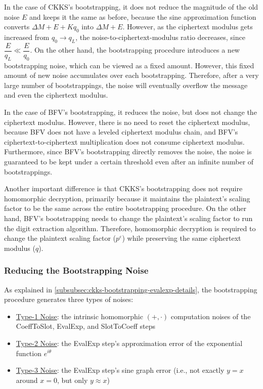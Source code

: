  In the case of CKKS's bootstrapping, it does not reduce the magnitude of the old noise $E$ and keeps it the same as before, because the sine approximation function converts $\Delta M + E + Kq_0$ into $\Delta M + E$. However, as the ciphertext modulus gets increased from $q_0 \rightarrow q_L$, the noise-to-ciphertext-modulus ratio decreases, since $\dfrac{E}{q_L} \ll \dfrac{E}{q_0}$. On the other hand, the bootstrapping procedure introduces a new bootstrapping noise, which can be viewed as a fixed amount. However, this fixed amount of new noise accumulates over each bootstrapping. Therefore, after a very large number of bootstrappings, the noise will eventually overflow the message and even the ciphertext modulus. 

In the case of BFV's bootstrapping, it reduces the noise, but does not change the ciphertext modulus. However, there is no need to reset the ciphertext modulus, because BFV does not have a leveled ciphertext modulus chain, and BFV's ciphertext-to-ciphertext multiplication does not consume ciphertext modulus. Furthermore, since BFV's bootstrapping directly removes the noise, the noise is guaranteed to be kept under a certain threshold even after an infinite number of bootstrappings. 

Another important difference is that CKKS's bootstrapping does not require homomorphic decryption, primarily because it maintains the plaintext's scaling factor to be the same across the entire bootstrapping procedure. On the other hand, BFV's bootstrapping needs to change the plaintext's scaling factor to run the digit extraction algorithm. Therefore, homomorphic decryption is required to change the plaintext scaling factor ($p^{\varepsilon}$) while preserving the same ciphertext modulus ($q$). 





\subsubsection{Reducing the Bootstrapping Noise}
\label{subsubsec:ckks-bootstrapping-noise-reduction}

As explained in \autoref{subsubsec:ckks-bootstrapping-evalexp-details}, the bootstrapping procedure generates three types of noises:

\begin{itemize}
\item \underline{Type-1 Noise}: the intrinsic homomorphic $(+, \cdot)$ computation noises of the \textsf{CoeffToSlot}, \textsf{EvalExp}, and \textsf{SlotToCoeff} steps
\item \underline{Type-2 Noise}: the \textsf{EvalExp} step's approximation error of the exponential function $e^{i\theta}$
\item \underline{Type-3 Noise}: the \textsf{EvalExp} step's sine graph error (i.e., not exactly $y=x$ around $x=0$, but only $y \approx x$)
\end{itemize}

